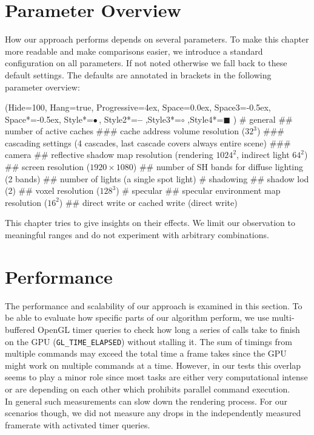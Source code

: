 \documentclass[thesis.tex]{subfiles}
\begin{document}
\section{Parameter Overview} \label{sec:eva:params}
How our approach performs depends on several parameters.
To make this chapter more readable and make comparisons easier, we introduce a standard configuration on all parameters.
If not noted otherwise we fall back to these default settings.
The defaults are annotated in brackets in the following parameter overview:
\begin{easylist}
\ListProperties(Hide=100, Hang=true, Progressive=4ex, Space=0.0ex, Space3=-0.5ex, Space*=-0.5ex, Style*=$\bullet\,$,
Style2*=\textbf{--} ,Style3*=$\circ$ ,Style4*=\tiny$\blacksquare$ )
# general
## number of active caches
### cache address volume resolution ($32^3$)
### cascading settings (4 cascades, last cascade covers always entire scene)
### camera
## reflective shadow map resolution (rendering $1024^2$, indirect light $64^2$)
## screen resolution ($1920\times1080$)
## number of SH bands for diffuse lighting (2 bands)
## number of lights (a single spot light)
# shadowing
## shadow lod (2)
## voxel resolution ($128^3$)
# specular
## specular environment map resolution ($16^2$)
## direct write or cached write (direct write)
\end{easylist}
This chapter tries to give insights on their effects.
We limit our observation to meaningful ranges and do not experiment with arbitrary combinations.

\section{Performance}
The performance and scalability of our approach is examined in this section.
To be able to evaluate how specific parts of our algorithm perform, we use multi-buffered OpenGL timer queries to check how long a series of calls take to finish on the GPU (\texttt{GL\_TIME\_ELAPSED}) without stalling it.
The sum of timings from multiple commands may exceed the total time a frame takes since the GPU might work on multiple commands at a time.
However, in our tests this overlap seems to play a minor role since most tasks are either very computational intense or are depending on each other which prohibits parallel command execution.
\\
In general such measurements can slow down the rendering process.
For our scenarios though, we did not measure any drops in the independently measured framerate with activated timer queries.
\end{document}
